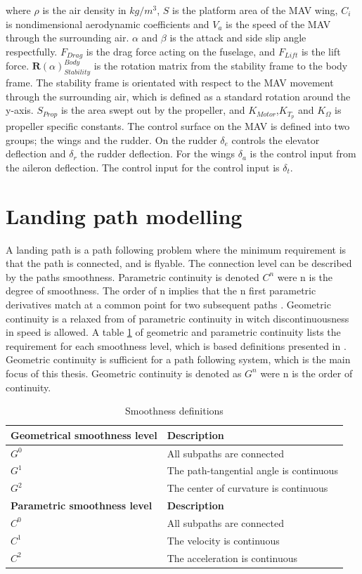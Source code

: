 where $\rho$ is the air density in $kg/m^3$, $S$ is the platform area of the MAV wing, $C_i$ is nondimensional aerodynamic coefficients and $V_a$ is the speed of the MAV through the surrounding air. $\alpha$ and $\beta$ is the attack and side slip angle respectfully. $F_{Drag}$ is the drag force acting on the fuselage, and $F_{Lift}$ is the lift force. $\mathbf{R}(\alpha)_{Stability}^{Body}$ is the rotation matrix from the stability frame to the body frame. The stability frame is orientated with respect to the MAV movement through the surrounding air, which is defined as a standard rotation around the y-axis. $S_{Prop}$ is the area swept out by the propeller, and $K_{Motor}$,$K_{T_p}$ and $K_\Omega$ is propeller specific constants. The control surface on the MAV is defined into two groups; the wings and the rudder. On the rudder $\delta_e$ controls the elevator deflection and $\delta_r$ the rudder deflection. For the wings $\delta_a$ is the control input from the aileron deflection. The control input for the control input is $\delta_t$.
\section{Landing path modelling}
A landing path is a path following problem where the minimum requirement is that the path is connected, and is flyable. The connection level can be described by the paths smoothness. Parametric continuity is denoted $C^n$ were n is the degree of smoothness. The order of n implies that the n first parametric derivatives match at a common point for two subsequent paths \citep{barsky1989geometric}. Geometric continuity is a relaxed from of parametric continuity in witch discontinuousness in speed is allowed. A table \ref{TB:SmoothnessDescriptions} of geometric and parametric continuity lists the requirement for each smoothness level, which is based definitions presented in \citep{barsky1989geometric}.
Geometric continuity is sufficient for a path following system, which is the main focus of this thesis. Geometric continuity is denoted as $G^n$ were n is the order of continuity.

\begin{table}[H]
\begin{center}
\begin{tabular}{| l | | l |}
\hline
\textbf{Geometrical smoothness level} & \textbf{Description} \\ \hline
$G^0$ & All subpaths are connected \\ \hline
$G^1$ & The path-tangential angle is continuous \\ \hline
$G^2$ & The center of curvature is continuous \\ \hline
\textbf{Parametric smoothness level} & \textbf{Description} \\ \hline
$C^0$ & All subpaths are connected \\ \hline
$C^1$ & The velocity is continuous \\ \hline
$C^2$ & The acceleration is continuous \\ \hline
\end{tabular}
\end{center}
\caption{Smoothness definitions}
\label{TB:SmoothnessDescriptions}
\end{table} 

